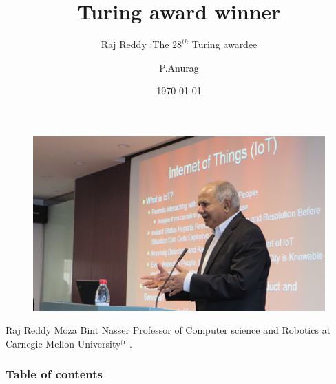 \documentclass{beamer}
\title{Turing award winner}
\subtitle{Raj Reddy :The  $ 28^{th} $ Turing awardee}
\author{P.Anurag}
\institute{SCIS University of Hyderabad}
\date{\today}
\begin{document}
 
\maketitle
 
\begin{frame}
\begin{figure}
 \centering
 \includegraphics[scale=0.5]{raj1.jpg}
\end{figure} 

\begin{block}{}
 Raj Reddy  Moza Bint Nasser Professor of Computer science and Robotics at 
 Carnegie Mellon University$^{\tiny \cite{1}}$.
\end{block}
\end{frame}

\begin{frame}
  \frametitle{Table of contents}
  \tableofcontents
\end{frame}
\end{document}
